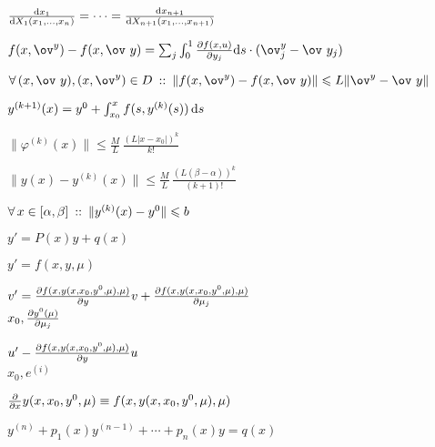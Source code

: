 \documentclass[hardcopy]{longnotes}
\begin{document}
\begin{list}
  \item $\fder{x_1}{X_1(x_1, \dotsc, x_n)} =\dotsb=\fder{x_{n+1}}{X_{n+1}(x_1, \dotsc, x_{n+1})}$
  \item $f(x, \ov^y)-f(x,\ov~y) = \sum_j \int_0^1\pder{f(x,u)}{y_j}\del s\cdot(\ov^y_j-\ov~y_j)$
  \item $\forall\, (x,\ov~y), (x,\ov^y) \in D \holds \|f(x,\ov^y) - f(x,\ov~y)\|
    \leqslant L \|\ov^y - \ov~y\|$
    \skeq
  \item $y^{(k+1)} (x) = y^0 + \int_{x_0}^x f(s,y^{(k)}(s))\, \mathrm{d} s$
  \item $\|\varphi^{(k)} (x)\| \leqslant \frac{M}{L} \, \frac{(L|x-x_0|)^k}{k!}  $
  \item $\|y(x) - y^{(k)} (x) \| \leqslant \frac{M}{L} \, \frac{(L(\beta-\alpha))^k}{(k+1)!} $
  \item $\forall\, x\in[\alpha, \beta] \:::\: \|y^{(k)} (x) - y^0 \| \leqslant b$
  \item $y' = P(x) y + q(x)$
  \item $y'=f(x,y,\mu)$
    \skeq
  \item $v' = \pder{f(x,y(x,x_0,y^0,\mu),\mu)}{y} v
    + \pder{f(x,y(x,x_0,y^0,\mu),\mu)}{\mu_j}$ \\
    $x_0, \pder{y^0(\mu)}{\mu_j}$
  \item $u' - \pder{f(x,y(x,x_0,y^0,\mu),\mu)}{y} u$ \\
    $x_0, e^{(i)}$
  \item $\pder{}{x} y (x,x_0,y^0,\mu) \equiv f(x,y(x,x_0,y^0,\mu),\mu)$
\nch
  \item $y^{(n)} + p_1(x) y^{(n-1)} + \dotsb + p_n(x) y = q(x)$
\nch


\end{list}
\end{document}
